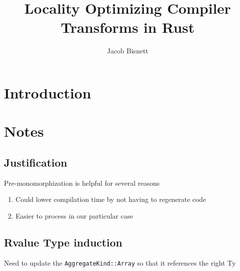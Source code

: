 \documentclass[12pt,final]{article}
\begin{document}
\title{Locality Optimizing Compiler Transforms in Rust}
\author{Jacob Bisnett}
\maketitle

\section{Introduction}
\label{sec:intro}


\section{Notes}
\label{sec:remove}

\subsection{Justification}
\label{sec:just}

Pre-monomorphization is helpful for several reasons
\begin{enumerate}
\item Could lower compilation time by not having to regenerate code
\item  Easier to process in our particular case
\end{enumerate}


\subsection{Rvalue Type induction}
Need to update the \texttt{AggregateKind::Array} so that it references the right Ty
\end{document}

